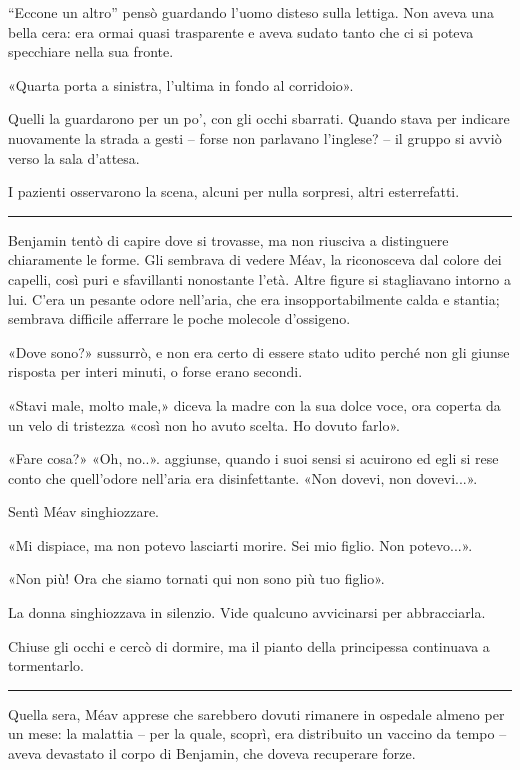 ``Eccone un altro'' pensò guardando l'uomo disteso sulla lettiga. Non aveva una bella cera: era
ormai quasi trasparente e aveva sudato tanto che ci si poteva specchiare nella sua fronte.

«Quarta porta a sinistra, l'ultima in fondo al corridoio».

Quelli la guardarono per un po', con gli occhi sbarrati. Quando stava per indicare nuovamente la
strada a gesti -- forse non parlavano l'inglese? -- il gruppo si avviò verso la sala d'attesa.

I pazienti osservarono la scena, alcuni per nulla sorpresi, altri esterrefatti.

\plainbreak{1}

Benjamin tentò di capire dove si trovasse, ma non riusciva a distinguere chiaramente le forme. Gli
sembrava di vedere Méav, la riconosceva dal colore dei capelli, così puri e sfavillanti nonostante
l'età. Altre figure si stagliavano intorno a lui. C'era un pesante odore nell'aria, che era
insopportabilmente calda e stantia; sembrava difficile afferrare le poche molecole d'ossigeno.

«Dove sono?» sussurrò, e non era certo di essere stato udito perché non gli giunse risposta per
interi minuti, o forse erano secondi.

«Stavi male, molto male,» diceva la madre con la sua dolce voce, ora coperta da un velo di tristezza
«così non ho avuto scelta. Ho dovuto farlo».

«Fare cosa?» «Oh, no..». aggiunse, quando i suoi sensi si acuirono ed egli si rese conto che
quell'odore nell'aria era disinfettante. «Non dovevi, non dovevi...».

Sentì Méav singhiozzare.

«Mi dispiace, ma non potevo lasciarti morire. Sei mio figlio. Non potevo...».

«Non più! Ora che siamo tornati qui non sono più tuo figlio».

La donna singhiozzava in silenzio. Vide qualcuno avvicinarsi per abbracciarla.

Chiuse gli occhi e cercò di dormire, ma il pianto della principessa continuava a tormentarlo.

\plainbreak{1}

Quella sera, Méav apprese che sarebbero dovuti rimanere in ospedale almeno per un mese: la malattia
-- per la quale, scoprì, era distribuito un vaccino da tempo -- aveva devastato il corpo di
Benjamin, che doveva recuperare forze.

